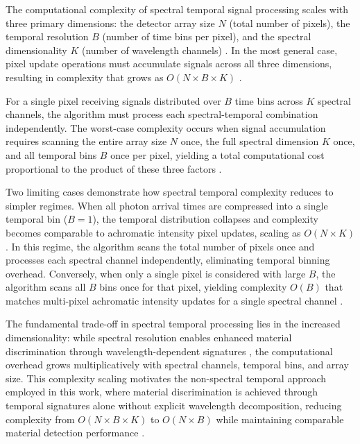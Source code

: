 \documentclass[12pt,a4paper,oneside]{report}
\begin{document}
The computational complexity of spectral temporal signal processing scales with three primary dimensions: the detector array size $N$ (total number of pixels), the temporal resolution $B$ (number of time bins per pixel), and the spectral dimensionality $K$ (number of wavelength channels) \cite{knuth1976}. In the most general case, pixel update operations must accumulate signals across all three dimensions, resulting in complexity that grows as $O(N \times B \times K)$ \cite{knuth1976}.

For a single pixel receiving signals distributed over $B$ time bins across $K$ spectral channels, the algorithm must process each spectral-temporal combination independently. The worst-case complexity occurs when signal accumulation requires scanning the entire array size $N$ once, the full spectral dimension $K$ once, and all temporal bins $B$ once per pixel, yielding a total computational cost proportional to the product of these three factors \cite{tontini2020,koerner2021}.

Two limiting cases demonstrate how spectral temporal complexity reduces to simpler regimes. When all photon arrival times are compressed into a single temporal bin ($B = 1$), the temporal distribution collapses and complexity becomes comparable to achromatic intensity pixel updates, scaling as $O(N \times K)$. In this regime, the algorithm scans the total number of pixels once and processes each spectral channel independently, eliminating temporal binning overhead. Conversely, when only a single pixel is considered with large $B$, the algorithm scans all $B$ bins once for that pixel, yielding complexity $O(B)$ that matches multi-pixel achromatic intensity updates for a single spectral channel \cite{koerner2021}.

The fundamental trade-off in spectral temporal processing lies in the increased dimensionality: while spectral resolution enables enhanced material discrimination through wavelength-dependent signatures \cite{inagaki2020,heinz2001}, the computational overhead grows multiplicatively with spectral channels, temporal bins, and array size. This complexity scaling motivates the non-spectral temporal approach employed in this work, where material discrimination is achieved through temporal signatures alone without explicit wavelength decomposition, reducing complexity from $O(N \times B \times K)$ to $O(N \times B)$ while maintaining comparable material detection performance \cite{su2016,becker2023}.
\end{document}
